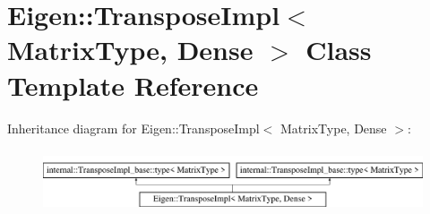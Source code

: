 \hypertarget{class_eigen_1_1_transpose_impl_3_01_matrix_type_00_01_dense_01_4}{}\section{Eigen\+:\+:Transpose\+Impl$<$ Matrix\+Type, Dense $>$ Class Template Reference}
\label{class_eigen_1_1_transpose_impl_3_01_matrix_type_00_01_dense_01_4}
Inheritance diagram for Eigen\+:\+:Transpose\+Impl$<$ Matrix\+Type, Dense $>$\+:\begin{figure}[H]
\begin{center}
\leavevmode
\includegraphics[height=1.866667cm]{class_eigen_1_1_transpose_impl_3_01_matrix_type_00_01_dense_01_4}
\end{center}
\end{figure}
